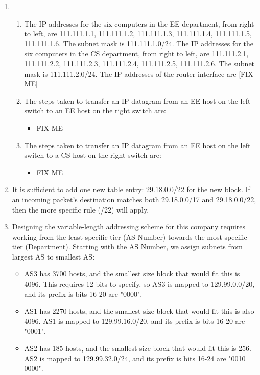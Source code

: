 \documentclass{article}
\begin{document}
\begin{enumerate}
\item
\begin{enumerate}
\item The IP addresses for the six computers in the EE department, from right to left, are 111.111.1.1, 111.111.1.2, 111.111.1.3, 111.111.1.4, 111.111.1.5, 111.111.1.6. The subnet mask is 111.111.1.0/24.
The IP addresses for the six computers in the CS department, from right to left, are 111.111.2.1, 111.111.2.2, 111.111.2.3, 111.111.2.4, 111.111.2.5, 111.111.2.6. The subnet mask is 111.111.2.0/24.
The IP addresses of the router interface are [FIX ME]
\item The steps taken to transfer an IP datagram from an EE host on the left switch to an EE host on the right switch are:
\begin{itemize}
\item FIX ME
\end{itemize}
\item The steps taken to transfer an IP datagram from an EE host on the left switch to a CS host on the right switch are:
\begin{itemize}
\item FIX ME
\end{itemize}
\end{enumerate}

\item It is sufficient to add one new table entry: 29.18.0.0/22 for the new block. If an incoming packet's destination matches both 29.18.0.0/17 and 29.18.0.0/22, then the more specific rule (/22) will apply.

\item Designing the variable-length addressing scheme for this company requires working from the least-specific tier (AS Number) towards the most-specific tier (Department). Starting with the AS Number, we assign subnets from largest AS to smallest AS:
\begin{itemize}
\item AS3 has 3700 hosts, and the smallest size block that would fit this is 4096. This requires 12 bits to specify, so AS3 is mapped to 129.99.0.0/20, and its prefix is bits 16-20 are "0000".
\item AS1 has 2270 hosts, and the smallest size block that would fit this is also 4096. AS1 is mapped to 129.99.16.0/20, and its prefix is bits 16-20 are "0001".
\item AS2 has 185 hosts, and the smallest size block that would fit this is 256. AS2 is mapped to 129.99.32.0/24, and its prefix is bits 16-24 are "0010 0000".
\end{itemize}


\end{enumerate}
\end{document}
